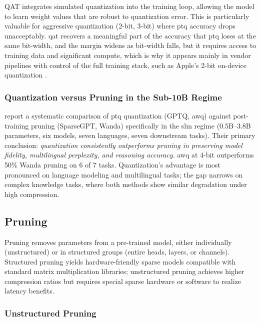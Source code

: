 QAT integrates simulated quantization into the training loop, allowing the model to learn weight values that are robust to quantization error. This is particularly valuable for aggressive quantization (2-bit, 3-bit) where \gls{ptq} accuracy drops unacceptably. \gls{qat} recovers a meaningful part of the accuracy that \gls{ptq} loses at the same bit-width, and the margin widens as bit-width falls, but it requires access to training data and significant compute, which is why it appears mainly in vendor pipelines with control of the full training stack, such as Apple's 2-bit on-device quantization \citep{gunter2025afm}.

\subsubsection{Quantization versus Pruning in the Sub-10B Regime}

\citet{kurz2025pruning_vs_quant} report a systematic comparison of \gls{ptq} quantization (GPTQ, \gls{awq}) against post-training pruning (SparseGPT, Wanda) specifically in the \gls{slm} regime (0.5B--3.8B parameters, six models, seven languages, seven downstream tasks). Their primary conclusion: \emph{quantization consistently outperforms pruning in preserving model fidelity, multilingual perplexity, and reasoning accuracy}. \gls{awq} at 4-bit outperforms 50\% Wanda pruning on 6 of 7 tasks. Quantization's advantage is most pronounced on language modeling and multilingual tasks; the gap narrows on complex knowledge tasks, where both methods show similar degradation under high compression.

\subsection{Pruning}
\label{subsec:compression_pruning}

Pruning removes parameters from a pre-trained model, either individually (unstructured) or in structured groups (entire heads, layers, or channels). Structured pruning yields hardware-friendly sparse models compatible with standard matrix multiplication libraries; unstructured pruning achieves higher compression ratios but requires special sparse hardware or software to realize latency benefits.

\subsubsection{Unstructured Pruning}

